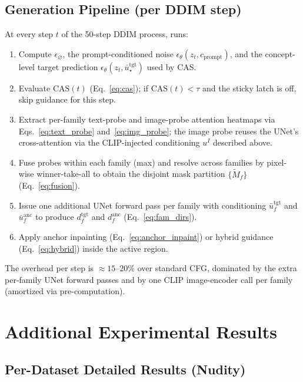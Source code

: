 \subsection{Generation Pipeline (per DDIM step)}
\label{app:pipeline}

At every step $t$ of the 50-step DDIM process, \ours{} runs:
\begin{enumerate}[leftmargin=1.5em,itemsep=1pt]
    \item Compute $\epsilon_\varnothing$, the prompt-conditioned noise $\epsilon_\theta(z_t, c_{\text{prompt}})$, and the concept-level target prediction $\epsilon_\theta(z_t, \bar{u}^{\text{tgt}}_{\star})$ used by CAS.
    \item Evaluate $\mathrm{CAS}(t)$ (Eq.~\ref{eq:cas}); if $\mathrm{CAS}(t) < \tau$ and the sticky latch is off, skip guidance for this step.
    \item Extract per-family text-probe and image-probe attention heatmaps via Eqs.~\ref{eq:text_probe} and~\ref{eq:img_probe}; the image probe reuses the UNet's cross-attention via the CLIP-injected conditioning $u^{I}$ described above.
    \item Fuse probes within each family (max) and resolve across families by pixel-wise winner-take-all to obtain the disjoint mask partition $\{\widetilde{M}_f\}$ (Eq.~\ref{eq:fusion}).
    \item Issue one additional UNet forward pass per family with conditioning $\bar{u}^{\text{tgt}}_f$ and $\bar{u}^{\text{anc}}_f$ to produce $d^{\text{tgt}}_f$ and $d^{\text{anc}}_f$ (Eq.~\ref{eq:fam_dirs}).
    \item Apply anchor inpainting (Eq.~\ref{eq:anchor_inpaint}) or hybrid guidance (Eq.~\ref{eq:hybrid}) inside the active region.
\end{enumerate}
The overhead per step is $\approx 15$--$20\%$ over standard CFG, dominated by the extra per-family UNet forward passes and by one CLIP image-encoder call per family (amortized via pre-computation).

\section{Additional Experimental Results}
\label{app:additional}

\subsection{Per-Dataset Detailed Results (Nudity)}
\label{app:per_dataset}

